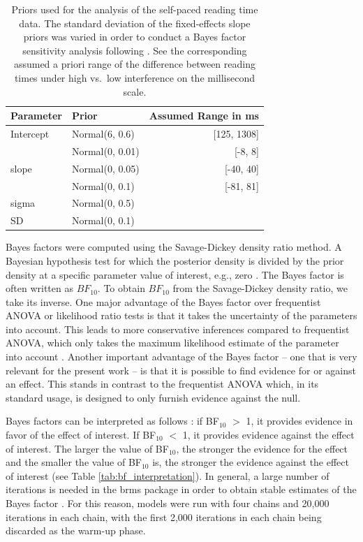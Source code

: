 \documentclass[review,preprint,12pt,authoryear,floatsintext]{elsarticle}
\begin{document}
\begin{table}[ht]
    \caption{Priors used for the analysis of the self-paced reading time data. The standard deviation of the fixed-effects slope priors was varied in order to conduct a Bayes factor sensitivity analysis following \citet{schad_etal_2022_BF}. See the corresponding assumed a priori range of the difference between reading times under high vs.\ low interference on the millisecond scale.}
    \label{tab:spr_priors}
    \centering
     \begin{tabular}{llr}
    \toprule
    Parameter&Prior &Assumed Range in ms\\
    \midrule
  Intercept & Normal(6, 0.6)& [125, 1308]\\
  \cmidrule{2-3}
  \multirow{3}{1cm}{slope} & Normal(0, 0.01) & [-8, 8]\\
  &  Normal(0, 0.05)&  [-40, 40]\\
  & Normal(0, 0.1) & [-81, 81]\\
  \cmidrule{2-3}
  sigma & Normal(0, 0.5)&\\
  SD & Normal(0, 0.1) &\\
  \bottomrule
  \end{tabular}
  \end{table}

Bayes factors were computed using the Savage-Dickey density ratio method. A Bayesian hypothesis test for which the posterior density is divided by the prior density at a specific parameter value of interest, e.g., zero \citep{wagenmakers_savagedickey, vuorre2017_savagedickey, dickey1970, dickey1971weighted, verdinelli1995computing}. The Bayes factor is often written as $BF_{10}$. To obtain $BF_{10}$ from the Savage-Dickey density ratio, we take its inverse. One major advantage of the Bayes factor over frequentist ANOVA or likelihood ratio tests is that it takes the uncertainty of the parameters into account. This leads to more conservative inferences compared to frequentist ANOVA, which only takes the maximum likelihood estimate of the parameter into account \citep[see][for detailed discussion]{schad_etal_2022_BF}. Another important advantage of the Bayes factor -- one that is very relevant for the present work -- is that it is possible to find evidence for or against an effect. This stands in contrast to the frequentist ANOVA which, in its standard usage, is designed to only furnish evidence against the null. 

Bayes factors can be interpreted as follows \citep[e.g., ][]{lee2014bayesian}: if BF$_{10}$ $>$ 1, it provides evidence in favor of the effect of interest. If BF$_{10}$ $<$ 1, it provides evidence against the effect of interest. The larger the value of BF$_{10}$, the stronger the evidence for the effect and the smaller the value of BF$_{10}$ is, the stronger the evidence against the effect of interest (see Table \ref{tab:bf_interpretation}). 
In general, a large number of iterations is needed in the brms package in order to obtain stable estimates of the Bayes factor  \citep{schad_etal_2022_BF}.
For this reason, models were run with four chains and 20,000 iterations in each chain, with the first 2,000 iterations in each chain being discarded as the warm-up phase.
\end{document}
